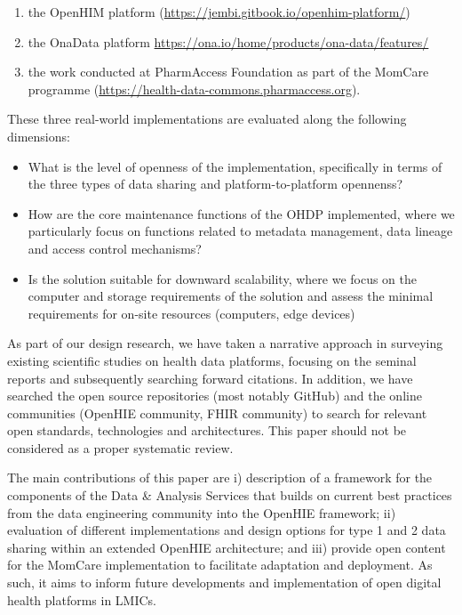\documentclass[
  authoryear]{elsarticle}
\providecommand{\tightlist}{%
  \setlength{\itemsep}{0pt}\setlength{\parskip}{0pt}}\usepackage{longtable,booktabs,array}
\begin{document}
\begin{enumerate}
\def\labelenumi{\arabic{enumi}.}
\tightlist
\item
  the OpenHIM platform
  (\url{https://jembi.gitbook.io/openhim-platform/})
\item
  the OnaData platform
  \url{https://ona.io/home/products/ona-data/features/}
\item
  the work conducted at PharmAccess Foundation as part of the MomCare
  programme (\url{https://health-data-commons.pharmaccess.org}).
\end{enumerate}

These three real-world implementations are evaluated along the following
dimensions:

\begin{itemize}
\tightlist
\item
  What is the level of openness of the implementation, specifically in
  terms of the three types of data sharing and platform-to-platform
  opennenss?
\item
  How are the core maintenance functions of the OHDP implemented, where
  we particularly focus on functions related to metadata management,
  data lineage and access control mechanisms?
\item
  Is the solution suitable for downward scalability, where we focus on
  the computer and storage requirements of the solution and assess the
  minimal requirements for on-site resources (computers, edge devices)
\end{itemize}

As part of our design research, we have taken a narrative approach in
surveying existing scientific studies on health data platforms, focusing
on the seminal reports and subsequently searching forward citations. In
addition, we have searched the open source repositories (most notably
GitHub) and the online communities (OpenHIE community, FHIR community)
to search for relevant open standards, technologies and architectures.
This paper should not be considered as a proper systematic review.

The main contributions of this paper are i) description of a framework
for the components of the Data \& Analysis Services that builds on
current best practices from the data engineering community into the
OpenHIE framework; ii) evaluation of different implementations and
design options for type 1 and 2 data sharing within an extended OpenHIE
architecture; and iii) provide open content for the MomCare
implementation to facilitate adaptation and deployment. As such, it aims
to inform future developments and implementation of open digital health
platforms in LMICs.
\end{document}
